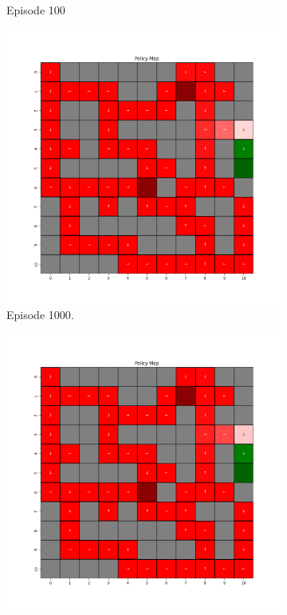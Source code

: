 \documentclass{assignment}
\begin{document}
\begin{figure}[H]
\begin{subfigure}{0.3\textwidth}
    \caption{Episode 100}
    \end{subfigure}
    \begin{subfigure}{0.3\textwidth}
        \includegraphics[width=\textwidth]{figures/policy_q/gamma_sweep/policy_alpha_0.1_gamma_0.5_epsilon_0.2_iteration_1000.png}
    \caption{Episode 1000.}
    \end{subfigure}\hfill
    \begin{subfigure}{0.3\textwidth}
        \includegraphics[width=\textwidth]{figures/policy_q/gamma_sweep/policy_alpha_0.1_gamma_0.5_epsilon_0.2_iteration_5000.png}

\end{subfigure}
\end{figure}
\end{document}
